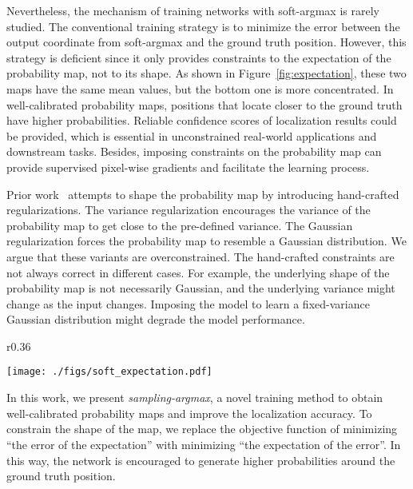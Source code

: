 \documentclass{article}
\begin{document}
Nevertheless, the mechanism of training networks with soft-argmax is rarely studied. The conventional training strategy is to minimize the error between the output coordinate from soft-argmax and the ground truth position. However, this strategy is deficient since it only provides constraints to the expectation of the probability map, not to its shape. As shown in Figure~\ref{fig:expectation}, these two maps have the same mean values, but the bottom one is more concentrated. In well-calibrated probability maps, positions that locate closer to the ground truth have higher probabilities. Reliable confidence scores of localization results could be provided, which is essential in unconstrained real-world applications and downstream tasks. Besides, imposing constraints on the probability map can provide supervised pixel-wise gradients and facilitate the learning process.


Prior work~\cite{nibali2018numerical} attempts to shape the probability map by introducing hand-crafted regularizations. The variance regularization encourages the variance of the probability map to get close to the pre-defined variance. The Gaussian regularization forces the probability map to resemble a Gaussian distribution. We argue that these variants are overconstrained. The hand-crafted constraints are not always correct in different cases. For example, the underlying shape of the probability map is not necessarily Gaussian, and the underlying variance might change as the input changes. Imposing the model to learn a fixed-variance Gaussian distribution might degrade the model performance.






\begin{wrapfigure}{r}{0.36\linewidth}
    \begin{center}
    \texttt{[image: ./figs/soft\_expectation.pdf]}
    \end{center}
    \vspace{-3mm}
    \caption{\textbf{Top}: an unconstrained probability map. \textbf{Bottom}: a well-calibrated probability map. These two maps have different shapes but a same mean value.}
    \label{fig:expectation}
    \vspace{-5mm}
\end{wrapfigure}
In this work, we present \textit{sampling-argmax}, a novel training method to obtain well-calibrated probability maps and improve the localization accuracy. To constrain the shape of the map, we replace the objective function of minimizing ``the error of the expectation'' with minimizing ``the expectation of the error''. In this way, the network is encouraged to generate higher probabilities around the ground truth position.
\end{document}
